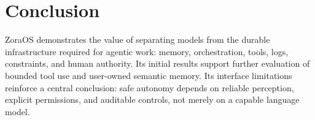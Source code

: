 \documentclass[11pt]{article}
\begin{document}
\section{Conclusion}
ZoraOS demonstrates the value of separating models from the durable infrastructure required for agentic work: memory, orchestration, tools, logs, constraints, and human authority. Its initial results support further evaluation of bounded tool use and user-owned semantic memory. Its interface limitations reinforce a central conclusion: safe autonomy depends on reliable perception, explicit permissions, and auditable controls, not merely on a capable language model.



\end{document}
